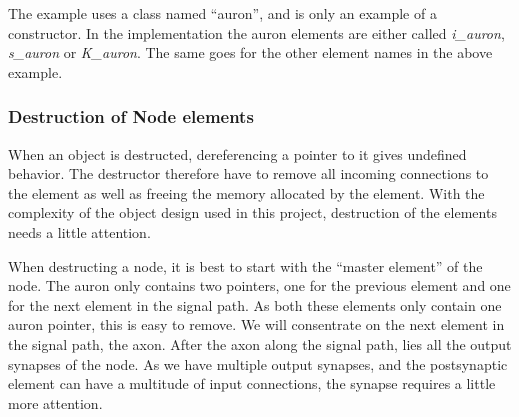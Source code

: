 	The example uses a class named ``auron'', and is only an example of a constructor. %
	In the implementation the auron elements are either called \emph{i\_auron}, \emph{s\_auron} or \emph{K\_auron}.
	The same goes for the other element names in the above example.

%
%			



	\subsubsection{Destruction of Node elements}
	When an object is destructed, dereferencing a pointer to it gives undefined behavior.  %
	The destructor therefore have to remove all incoming connections to the element as well as freeing the memory allocated by the element.
	With the complexity of the object design used in this project, destruction of the elements needs a little attention.


	When destructing a node, it is best to start with the ``master element'' of the node.
	The auron only contains two pointers, one for the previous element and one for the next element in the signal path.
	As both these elements only contain one auron pointer, this is easy to remove.
	We will consentrate on the next element in the signal path, the axon.
	After the axon along the signal path, lies all the output synapses of the node.
	As we have multiple output synapses, and the postsynaptic element can have a multitude of input connections, the synapse requires a little more attention.

